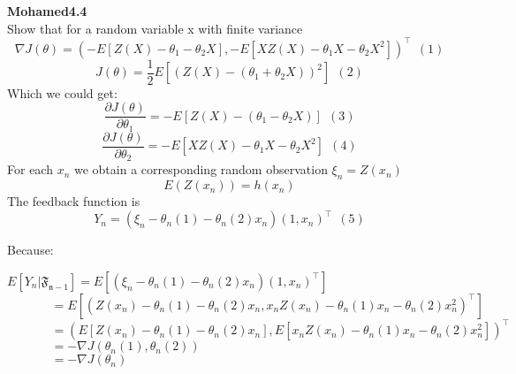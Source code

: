 \documentclass{article}
\begin{document}
\begin{comment}
\textbf {4.4}  \\
Because $$J(\theta) = \frac{1}{2}E[(Z(X)-(\theta_1+\theta_2X))^2]) \ \ (1)$$
And $$ \theta_{n+1} = \theta_n-\epsilon_n\nabla_\theta J(\theta_n)^\intercal = \theta_n+\epsilon_nE[(Z(X)-\theta_{n,1}-\theta_{n,2}X)(1,X)^\intercal] \ \ (2) $$
From (2), we notice $$ Y_n = (\xi_n-\theta_n(1)-\theta_n(2)x_n)(1,x_n)^\intercal \ \ (3)$$
$Y_n$ satisfies the Martingale difference noise model  \\
The updates $Y_n$ are random variables.  \\
For each $x_n$ we obtain a corresponding random observation $ \xi_n=Z(x_n)$ \\
The underlying process is just a sequence of iid random pairs that are statistically independent of $\theta$. Algorithm (4.1) then becomes:
$$ \theta_{n+1,1} = \theta_{n,1}-\epsilon_n(\xi_n-\theta_{n,1}-\theta_{n,2}x_n) \ \ (4)$$
$$ \theta_{n+1,2} = \theta_{n,2}-\epsilon_n(\xi_n-\theta_{n,1}-\theta_{n,2}x_n) \ \ (5)$$
From the question, 
$$ \nabla J(\theta) = (-E[Z(X)-\theta_1-\theta_2X], -E[XZ(X)-\theta_1X-\theta_2X^2])^\intercal  \ \ (6) $$
So
$$ -\nabla J(\theta) = (E[Z(X)-\theta_1-\theta_2X], E[XZ(X)-\theta_1X-\theta_2X^2])^\intercal  \ \ (7) $$

The difference between the trend and the realization is denoted by 
$$ \delta M_n = Y_n-E[Y_n|\mathfrak{F_{n-1}}] $$
Admits a Taylor approximation to $E[Y_n|\mathfrak{F_{n-1}}]$ 
$$ E[Y_n|\mathfrak{F_{n-1}}] = \frac{J(\theta_n+c_n)-J(\theta_n)}{2c_n} - \frac{J(\theta_n-c_n)-J(\theta_n)}{2c_n} $$
According to example 4.1 $$ = $$
\end{comment}



\textbf {Mohamed4.4}  \\
Show that  for a random variable x with finite variance
$$ \nabla J(\theta) = (-E[Z(X)-\theta_1-\theta_2X], -E[XZ(X)-\theta_1X-\theta_2X^2])^\intercal  \ \ (1) $$
$$J(\theta) = \frac{1}{2}E[(Z(X)-(\theta_1+\theta_2X))^2] \ \ (2)$$
Which we could get:
$$\frac{\partial J(\theta)}{\partial \theta_1} = -E[Z(X)-(\theta_1-\theta_2X)] \ \ (3) $$
$$\frac{\partial J(\theta)}{\partial \theta_2} = -E[XZ(X)-\theta_1X-\theta_2X^2]  \ \ (4)$$
For each $x_n$ we obtain a corresponding random observation $ \xi_n=Z(x_n)$ \\
$$ E(Z(x_n)) = h(x_n) $$
The feedback function is 
 $$ Y_n = (\xi_n-\theta_n(1)-\theta_n(2)x_n)(1,x_n)^\intercal \ \ (5)$$
 
Because:
\begin{flushleft}
$ E[Y_n|\mathfrak{F_{n-1}}] = E[(\xi_n-\theta_n(1)-\theta_n(2)x_n)(1,x_n)^\intercal] $  \\
$ \ \ \ \ \ \ \ \ \ \ \ \ \ \ \ \ =E[(Z(x_n)-\theta_n(1)-\theta_n(2)x_n, x_nZ(x_n)-\theta_n(1)x_n-\theta_n(2)x_n^2)^\intercal] $  \\
$ \ \ \ \ \ \ \ \ \ \ \ \ \ \ \ \ =(E[Z(x_n)-\theta_n(1)-\theta_n(2)x_n], E[x_nZ(x_n)-\theta_n(1)x_n-\theta_n(2)x_n^2])^\intercal $  \\
$ \ \ \ \ \ \ \ \ \ \ \ \ \ \ \ \ =-\nabla J(\theta_n(1),\theta_n(2)) $  \\
$ \ \ \ \ \ \ \ \ \ \ \ \ \ \ \ \ =-\nabla J(\theta_n) $
\end{flushleft} 
\end{document}
